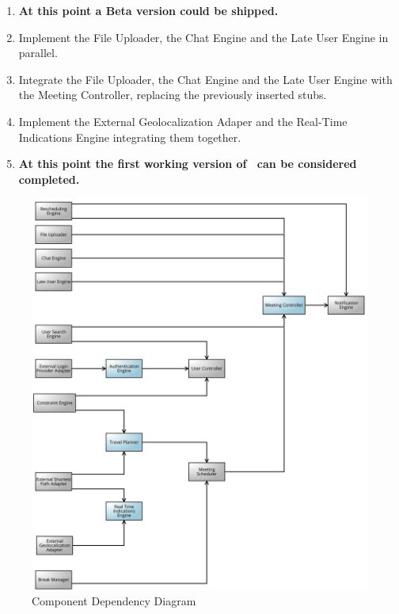 \begin{enumerate}
	 \item[ ]
	\textbf{At this point a Beta version could be shipped.}
	 \item Implement the File Uploader, the Chat Engine and the Late User Engine in parallel.
	 \item Integrate the File Uploader, the Chat Engine and the Late User Engine with the Meeting Controller, replacing the previously inserted stubs.
	 \item Implement the External Geolocalization Adaper and the Real-Time Indications Engine integrating them together.
	 \item[ ]
	\textbf{At this point the first working version of \projectname~can be considered completed.}
\end{enumerate}

\begin{figure}[!h]
	\centering\includegraphics[scale = 0.19]{Images/UMLDiagrams/DependencyDiagramColored.png}
	\caption{Component Dependency Diagram}
\end{figure}

\clearpage